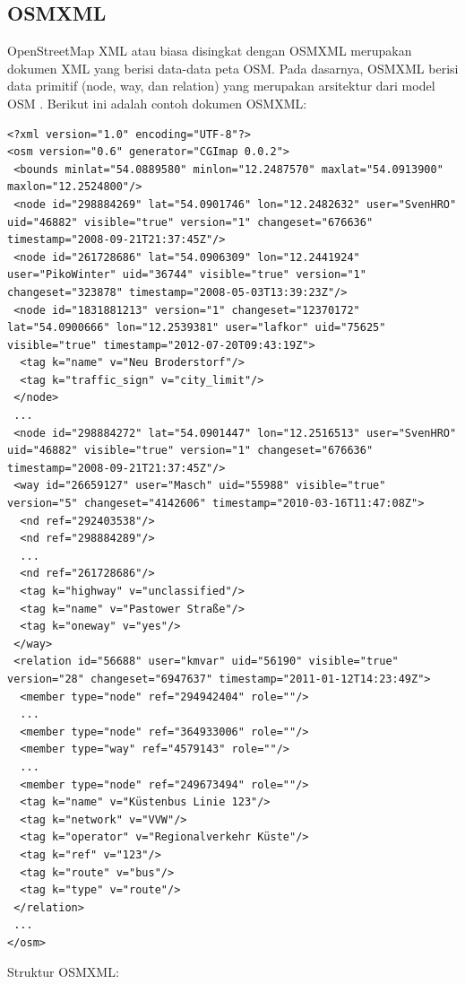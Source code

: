 \subsection{OSMXML} \label{ssec:osmxml}
OpenStreetMap XML atau biasa disingkat dengan OSMXML merupakan dokumen XML yang
berisi data-data peta OSM. Pada dasarnya, OSMXML berisi data primitif
(node, way, dan relation) yang merupakan arsitektur dari model OSM
\cite{osm}.
Berikut ini adalah contoh dokumen OSMXML:
\begin{lstlisting}
<?xml version="1.0" encoding="UTF-8"?>
<osm version="0.6" generator="CGImap 0.0.2">
 <bounds minlat="54.0889580" minlon="12.2487570" maxlat="54.0913900" maxlon="12.2524800"/>
 <node id="298884269" lat="54.0901746" lon="12.2482632" user="SvenHRO" uid="46882" visible="true" version="1" changeset="676636" timestamp="2008-09-21T21:37:45Z"/>
 <node id="261728686" lat="54.0906309" lon="12.2441924" user="PikoWinter" uid="36744" visible="true" version="1" changeset="323878" timestamp="2008-05-03T13:39:23Z"/>
 <node id="1831881213" version="1" changeset="12370172" lat="54.0900666" lon="12.2539381" user="lafkor" uid="75625" visible="true" timestamp="2012-07-20T09:43:19Z">
  <tag k="name" v="Neu Broderstorf"/>
  <tag k="traffic_sign" v="city_limit"/>
 </node>
 ...
 <node id="298884272" lat="54.0901447" lon="12.2516513" user="SvenHRO" uid="46882" visible="true" version="1" changeset="676636" timestamp="2008-09-21T21:37:45Z"/>
 <way id="26659127" user="Masch" uid="55988" visible="true" version="5" changeset="4142606" timestamp="2010-03-16T11:47:08Z">
  <nd ref="292403538"/>
  <nd ref="298884289"/>
  ...
  <nd ref="261728686"/>
  <tag k="highway" v="unclassified"/>
  <tag k="name" v="Pastower Straße"/>
  <tag k="oneway" v="yes"/>
 </way>
 <relation id="56688" user="kmvar" uid="56190" visible="true" version="28" changeset="6947637" timestamp="2011-01-12T14:23:49Z">
  <member type="node" ref="294942404" role=""/>
  ...
  <member type="node" ref="364933006" role=""/>
  <member type="way" ref="4579143" role=""/>
  ...
  <member type="node" ref="249673494" role=""/>
  <tag k="name" v="Küstenbus Linie 123"/>
  <tag k="network" v="VVW"/>
  <tag k="operator" v="Regionalverkehr Küste"/>
  <tag k="ref" v="123"/>
  <tag k="route" v="bus"/>
  <tag k="type" v="route"/>
 </relation>
 ...
</osm>
\end{lstlisting}
Struktur OSMXML:

